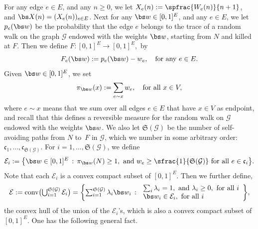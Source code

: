 For any edge $e\in E$, and any $n\ge 0$, we let $X_e(n) := \spfrac{W_e(n)}{n+1}$, and $\bs X(n)= (X_e(n))_{e\in E}$.
Next for any $\bs w \in [0,1]^E$, and any $e\in E$, we let $p_e({\bs w})$
be the probability that the edge $e$ belongs to the trace of a random walk on the graph $\mathcal G$ endowed with the weights $\bs w$, starting from $N$ and killed at $F$. Then we define
$F:[0,1]^E\to [0,1]^E$,~by
\begin{equation}\label{def.F}
F_e(\bs w) := p_e(\bs w) - w_e,\quad \text{for any }e\in E.
\end{equation}
Given $\bs w \in [0,1]^E$, we set
\[
\pi_{\bs w}(x): = \sum_{e\sim x} w_e, \quad \text{for all } x\in V,
\]
where $e\sim x$ means that we sum over all edges $e\in E$ that {have $x\in V$ as endpoint}, and recall that this defines a reversible measure for the random walk on $\mathcal G$ endowed with the weights $\bs w$.
We also let $\mathfrak S(\mathcal G)$ be the number of self-avoiding paths from $N$ to~$F$ in $\mathcal G$, which we number in some arbitrary order: $\mathfrak c_1,\dots, \mathfrak c_{\mathfrak S(\mathcal G)}$.
For $i=1,\dots, \mathfrak S(\mathcal G)$, we define
\[
\mathcal E_i:= \bigl\{\bs w\in [0,1]^E \, : \, \pi_{\bs w}(N)\ge 1, \text{ and } w_e\ge \sfrac{1}{\mathfrak S(\mathcal G)} \ \text{for all }e\in \mathfrak c_i\bigr\}. 
\]
Note that each $\mathcal E_i$ is a convex compact subset of $[0,1]^E$. Then we further define,
\begin{equation}\label{def.E} \textstyle
\mathcal E:= \text{conv}\bigl({\bigcup_{i=1}^{\mathfrak S(\mathcal G)} \mathcal E_i} \bigr)
= \biggl\{\sum_{i=1}^{\mathfrak S(\mathcal G)} \lambda_i \bs w_i \, : \, \begin{array}{ll}
\sum_i \lambda_i = 1, \text{ and } \lambda_i\ge 0, \text{ for all }i \\
\bs w_i\in \mathcal E_i, \text{ for all } i
\end{array} \biggr\},
\end{equation}
the convex hull of the union of the $\mathcal E_i$'s, which is also a convex compact subset of $[0,1]^E$.
One has the following general fact.

